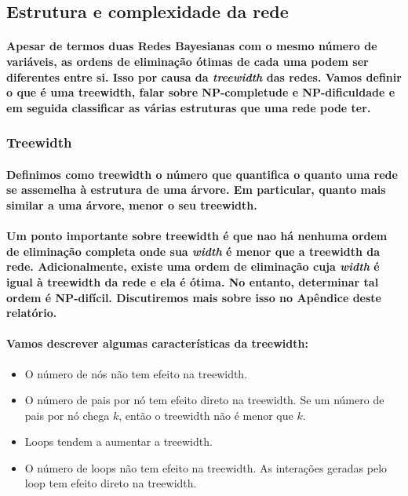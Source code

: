 \documentclass[a4paper,10pt]{article}
\theoremstyle{plain}
\begin{document}
\subsection{Estrutura e complexidade da rede}

\paragraph{
  Apesar de termos duas Redes Bayesianas com o mesmo número de variáveis, as ordens de eliminação
  ótimas de cada uma podem ser diferentes entre si. Isso por causa da \textit{treewidth} das redes.
  Vamos definir o que é uma treewidth, falar sobre NP-completude e NP-dificuldade e em seguida
  classificar as várias estruturas que uma rede pode ter. 
}

\subsubsection{Treewidth}

\paragraph{
  Definimos como treewidth o número que quantifica o quanto uma rede se assemelha à estrutura de 
  uma árvore. Em particular, quanto mais similar a uma árvore, menor o seu treewidth. 
}

\paragraph{
  Um ponto importante sobre treewidth é que nao há nenhuma ordem de eliminação completa onde sua
  \textit{width} é menor que a treewidth da rede. Adicionalmente, existe uma ordem de eliminação
  cuja \textit{width} é igual à treewidth da rede e ela é ótima. No entanto, determinar tal ordem é 
  NP-difícil. Discutiremos mais sobre isso no Apêndice deste relatório.
}

\paragraph{
  Vamos descrever algumas características da treewidth:
}

\begin{itemize}
  \item O número de nós não tem efeito na treewidth.
  \item O número de pais por nó tem efeito direto na treewidth. Se um número de pais por nó chega
    $k$, então o treewidth não é menor que $k$.
  \item Loops tendem a aumentar a treewidth.
  \item O número de loops não tem efeito na treewidth. As interações geradas pelo loop tem efeito
    direto na treewidth.
\end{itemize}
\end{document}

